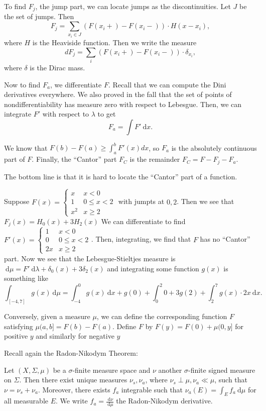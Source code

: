 \documentclass[10pt, twoside]{article}
\renewcommand{\d}{\ \mathrm{d}}
\begin{document}
   To find $F_j$, the jump part, we can locate jumps as the discontinuities.
   Let $J$ be the set of jumps. Then \[ F_j = \sum_{x_i \in J} (F(x_i+) -
       F(x_i-))\cdot H(x-x_i), \] where $H$ is the Heaviside function. Then we
       write the measure \[dF_j = \sum_i (F(x_i+) - F(x_i-)) \cdot
       \delta_{x_i},\] where $\delta$ is the Dirac mass.

    Now to find $F_a$, we differentiate $F$. Recall that we can compute the
    Dini derivatives everywhere. We also proved in the fall that the set of
    points of nondifferentiability has measure zero with respect to Lebesgue.
    Then, we can integrate $F'$ with respect to $\lambda$ to get \[F_a = \int
    F' \d x.\]

    We know that $F(b) - F(a) \geq \int_a^b F'(x) dx$, so $F_a$ is the
    absolutely continuous part of $F$. Finally, the ``Cantor'' part $F_C$ is
    the remainder $F_C = F-F_j-F_a$.
    
    The bottom line is that it is hard to locate the ``Cantor'' part of a
    function.
    
    \begin{exm} Suppose $F(x) = \begin{cases} x & x < 0 \\ 1 & 0 \leq x < 2 \\
        x^2 & x \geq 2 \end{cases}$ with jumpts at $0,2$. Then we see that
        $F_j(x) = H_0(x) + 3H_2(x)$ We can differentiate to find $F'(x) =
        \begin{cases} 1 & x < 0 \\ 0 & 0 \leq x < 2 \\ 2x & x \geq 2
            \end{cases}$. Then, integrating, we find that $F$ has no ``Cantor''
            part. Now we see that the Lebesgue-Stieltjes measure is $\d \mu =
            F' \d \lambda + \delta_0(x) + 3 \delta_2(x)$ and integrating some
            function $g(x)$ is something like \[\int_{[-4,7]}g(x) \d\mu =
            \int_{-4}^0 g(x) \d x + g(0) + \int_0^2 0 + 3g(2) + \int_2^7
        g(x)\cdot 2x \d x.\] \end{exm}
    
    Conversely, given a measure $\mu$, we can define the corresponding function
    $F$ satisfying $\mu(a,b] = F(b) - F(a)$. Define $F$ by $F(y) = F(0) +
    \mu(0,y]$ for positive $y$ and similarly for negative $y$

    Recall again the Radon-Nikodym Theorem: \begin{thm} Let $(X,
        \Sigma, \mu)$ be a $\sigma$-finite measure space and $\nu$ another
        $\sigma$-finite signed measure on $\Sigma$. Then there exist unique
        measures $\nu_s, \nu_a$, where $\nu_s \perp \mu, \nu_a \ll \mu$, such
        that $\nu = \nu_s + \nu_a$. Moreover, there exists $f_a$ integrable
        such that $\nu_a(E) = \int_E f_a \d\mu$ for all measurable $E$. We
        write $f_a = \frac{\d\nu}{\d\mu}$ the Radon-Nikodym derivative.
    \end{thm}
\end{document}
